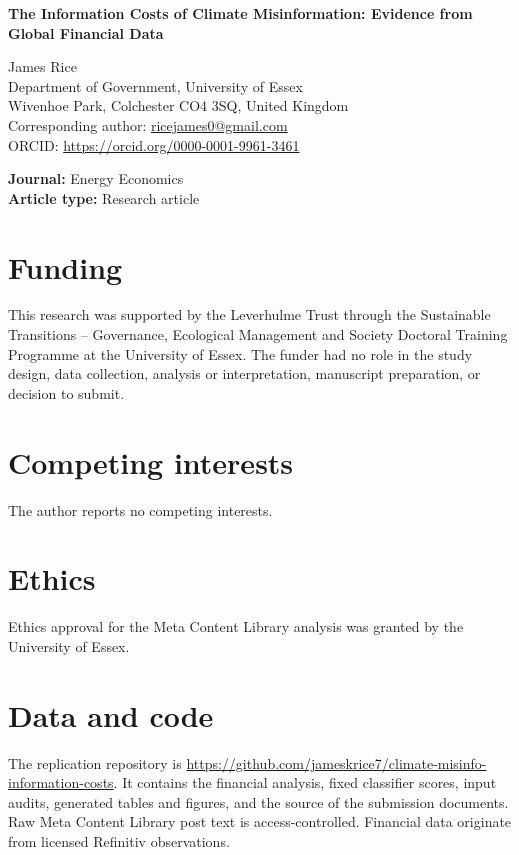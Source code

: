 \documentclass[12pt,a4paper]{article}
\begin{document}
\begin{center}
{\Large\bfseries The Information Costs of Climate Misinformation: Evidence from Global Financial Data\par}
\vspace{1.5em}
James Rice\\[.5em]
Department of Government, University of Essex\\
Wivenhoe Park, Colchester CO4 3SQ, United Kingdom\\[.5em]
Corresponding author: \href{mailto:ricejames0@gmail.com}{ricejames0@gmail.com}\\
ORCID: \url{https://orcid.org/0000-0001-9961-3461}
\end{center}
\vspace{1em}
\noindent\textbf{Journal:} Energy Economics\\
\textbf{Article type:} Research article

\section*{Funding}
This research was supported by the Leverhulme Trust through the Sustainable Transitions -- Governance, Ecological Management and Society Doctoral Training Programme at the University of Essex. The funder had no role in the study design, data collection, analysis or interpretation, manuscript preparation, or decision to submit.

\section*{Competing interests}
The author reports no competing interests.

\section*{Ethics}
Ethics approval for the Meta Content Library analysis was granted by the University of Essex.

\section*{Data and code}
The replication repository is \url{https://github.com/jameskrice7/climate-misinfo-information-costs}. It contains the financial analysis, fixed classifier scores, input audits, generated tables and figures, and the source of the submission documents. Raw Meta Content Library post text is access-controlled. Financial data originate from licensed Refinitiv observations.
\end{document}
